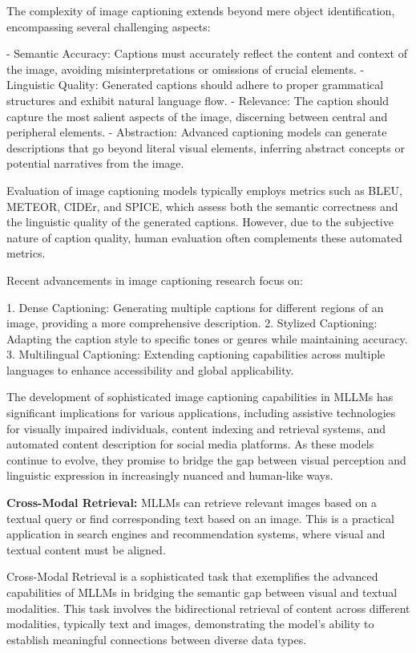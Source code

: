 The complexity of image captioning extends beyond mere object identification, encompassing several challenging aspects:

- Semantic Accuracy: Captions must accurately reflect the content and context of the image, avoiding misinterpretations or omissions of crucial elements.
- Linguistic Quality: Generated captions should adhere to proper grammatical structures and exhibit natural language flow.
- Relevance: The caption should capture the most salient aspects of the image, discerning between central and peripheral elements.
- Abstraction: Advanced captioning models can generate descriptions that go beyond literal visual elements, inferring abstract concepts or potential narratives from the image.

Evaluation of image captioning models typically employs metrics such as BLEU, METEOR, CIDEr, and SPICE, which assess both the semantic correctness and the linguistic quality of the generated captions. However, due to the subjective nature of caption quality, human evaluation often complements these automated metrics.

Recent advancements in image captioning research focus on:

1. Dense Captioning: Generating multiple captions for different regions of an image, providing a more comprehensive description.
2. Stylized Captioning: Adapting the caption style to specific tones or genres while maintaining accuracy.
3. Multilingual Captioning: Extending captioning capabilities across multiple languages to enhance accessibility and global applicability.

The development of sophisticated image captioning capabilities in MLLMs has significant implications for various applications, including assistive technologies for visually impaired individuals, content indexing and retrieval systems, and automated content description for social media platforms. As these models continue to evolve, they promise to bridge the gap between visual perception and linguistic expression in increasingly nuanced and human-like ways.


\textbf{Cross-Modal Retrieval:} MLLMs can retrieve relevant images based on a textual query or find corresponding text based on an image. This is a practical application in search engines and recommendation systems, where visual and textual content must be aligned.

Cross-Modal Retrieval is a sophisticated task that exemplifies the advanced capabilities of MLLMs in bridging the semantic gap between visual and textual modalities. This task involves the bidirectional retrieval of content across different modalities, typically text and images, demonstrating the model's ability to establish meaningful connections between diverse data types.

